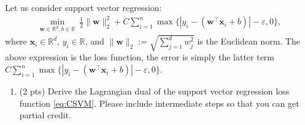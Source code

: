 \documentclass[10pt,letter,notitlepage]{article}
\newcommand{\RR}{\mathds{R}}
\newcommand{\wv}{\mathbf{w}}
\newcommand{\xv}{\mathbf{x}}
\newcounter{exercise}
\begin{document}
\begin{exercise}
Let us consider support vector regression:
\begin{align}
\label{eq:CSVM}
\min_{\wv\in \RR^d, 
b\in\RR}  ~ \frac{1}{2} \|\wv\|_2^2 + C\sum_{i=1}^n \max\{ | y_i -  (\wv^\top \xv_i + b)| -\varepsilon , 0 \},
\end{align}
where $\xv_i \in \RR^d$, $y_i \in \RR$, and $\|\wv\|_2 := \sqrt{\sum_{j=1}^d w_j^2}$ is the Euclidean norm.
The above expression is the loss function, the error is simply the latter term $C\sum_{i=1}^n \max\{ | y_i -  (\wv^\top \xv_i + b)| -\varepsilon , 0 \}$.

\begin{enumerate}
	
\item (2 pts) Derive the Lagrangian dual of the support vector regression loss function \eqref{eq:CSVM}. Please include intermediate steps so that you can get partial credit.


\end{enumerate}
\end{exercise}
\end{document}
